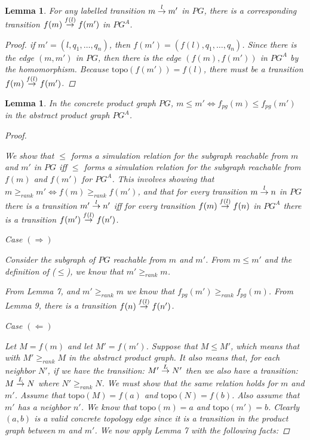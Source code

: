 \documentclass[twocolumn, openany]{sig-alternate-10pt}
\newcommand{\Topo}{\ensuremath{\mathrm{topo}}}
\newtheorem{lem}[thm]{Lemma}
\begin{document}
\begin{lem}
  For any labelled transition $\trans{m}{m'}{l}$ in $PG$, there is a corresponding transition $\trans{f(m)}{f(m')}{f(l)}$ in $PG^A$.
  \begin{proof}
    if $m' = (l, q_1, \ldots, q_n)$, then $f(m') = (f(l), q_1, \ldots, q_n)$. Since there is the edge $(m,m')$ in $PG$, then there is the edge $(f(m),f(m'))$ in $PG^A$ by the homomorphism. Because $\Topo(f(m')) = f(l)$, there must be a transition $\trans{f(m)}{f(m')}{f(l)}$.
  \end{proof}
\end{lem}



\vspace{.4em}
\begin{lem}
  In the concrete product graph $PG$, $m \leq m' \iff f_{pg}(m) \leq f_{pg}(m')$ in the abstract product graph $PG^A$.
  \begin{proof}
    $ $

    \vspace{1em}
    \noindent
    We show that $\leq$ forms a simulation relation for the subgraph reachable from $m$ and $m'$ in $PG$ iff $\leq$ forms a simulation relation for the subgraph reachable from $f(m)$ and $f(m')$ for $PG^A$. This involves showing that $m \geq_{rank} m' \iff f(m) \geq_{rank} f(m')$, and that 
    for every transition $\trans{m}{n}{l}$ in $PG$ there is a transition $\trans{m'}{n'}{l}$ iff for every transition $\trans{f(m)}{f(n)}{f(l)}$ in $PG^A$ there is a transition $\trans{f(m')}{f(n')}{f(l)}$.

    \vspace{1em}
    \noindent
    \emph{Case} $(\Rightarrow)$

    \vspace{.4em}
    Consider the subgraph of $PG$ reachable from $m$ and $m'$. From $m \leq m'$ and the definition of ($\leq$), we know that $m' \geq_{rank} m$. 

    \noindent
    From Lemma 7, and $m' \geq_{rank} m$ we know that $f_{pg}(m') \geq_{rank} f_{pg}(m)$. 
    From Lemma 9, there is a transition $\trans{f(n)}{f(n')}{f(l)}$.

    \vspace{1.2em}
    \noindent
    \emph{Case} $(\Leftarrow)$

    \vspace{.4em}
    Let $M = f(m)$ and let $M' = f(m')$.
    Suppose that $M \leq M'$, which means that with $M' \geq_{rank} M$ in the abstract product graph. It also means that, for each neighbor $N'$, if we have the transition: $\trans{M'}{N'}{L}$ then we also have a transition: $\trans{M}{N}{L}$ where $N' \geq_{rank} N$. We must show that the same relation holds for $m$ and $m'$. 
    Assume that $\Topo(M) = f(a)$ and $\Topo(N) = f(b)$. Also assume that $m'$ has a neighbor $n'$. We know that $\Topo(m) = a$ and $\Topo(m') = b$. Clearly $(a,b)$ is a valid concrete topology edge since it is a transition in the product graph between $m$ and $m'$. We now apply Lemma 7 with the following facts:


\end{proof}
\end{lem}
\end{document}
